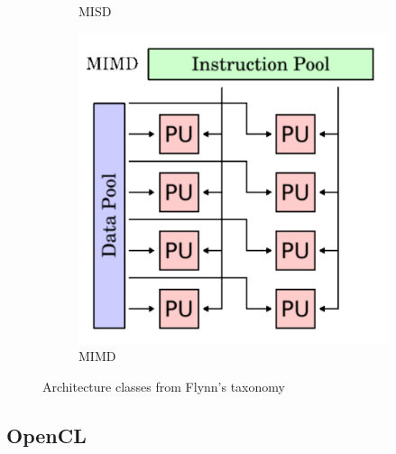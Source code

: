 \documentclass[a4paper, 11pt]{report}
\begin{document}
\begin{figure}[ht]
\begin{subfigure}[t]{0.4\textwidth}
		\caption{MISD}\label{fig:misd}
	\end{subfigure}
	\begin{subfigure}[t]{0.4\textwidth}
		\centering
		\includegraphics[scale=.3]{images/mimd.pdf}
		\caption{MIMD}\label{fig:mimd}
	\end{subfigure}
	\caption{Architecture classes from Flynn's taxonomy}\label{fig:archFlynnTax}
\end{figure}


\subsection{OpenCL}\label{subsec:OpenCL}
\end{document}
